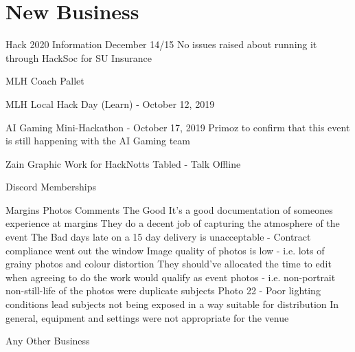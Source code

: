 \documentclass[11pt,hacksoc]{meetingmins}
\begin{document}
\section{New Business}
\begin{items}
	\item Hack 2020 Information
		\subitem December 14/15
		\subitem No issues raised about running it through HackSoc for SU Insurance
	\item MLH Coach Pallet
		\subitem 
	\item MLH Local Hack Day (Learn) - October 12, 2019
	\item AI Gaming Mini-Hackathon - October 17, 2019
		\subitem Primoz to confirm that this event is still happening with the AI Gaming team
	\item Zain Graphic Work for HackNotts
		\subitem Tabled - Talk Offline
	\item Discord Memberships
		\subitem 
	\item Margins Photos Comments
		\subitem The Good
			\subsubitem It's a good documentation of someones experience at margins
			\subsubitem They do a decent job of capturing the atmosphere of the event
		\subitem The Bad
			 days late on a 15 day delivery is unacceptable - Contract compliance went out the window
			\subsubitem Image quality of photos is low - i.e. lots of grainy photos and colour distortion
			\subsubitem They should've allocated the time to edit when agreeing to do the work
			 would qualify as event photos - i.e. non-portrait non-still-life
			 of the photos were duplicate subjects
			\subsubitem Photo 22 - Poor lighting conditions lead subjects not being exposed in a way suitable for distribution
			\subsubitem In general, equipment and settings were not appropriate for the venue
	\item Any Other Business
\end{items}

\vspace{1em}
\nextmeeting{}
\end{document}
